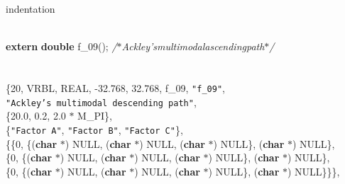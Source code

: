 %
%
\expandafter\ifx\csname indentation\endcsname\relax
\newlength{\indentation}\fi
\setlength{\indentation}{0.5em}
\begin{flushleft}
\mbox{}\\
{\bf extern} {\bf double}	f\_09();		\hfill{\it /$\ast$\hspace*{1\indentation}Ackley's\hspace*{1\indentation}multimodal\hspace*{1\indentation}ascending\hspace*{1\indentation}path\hspace*{8\indentation}$\ast$/}\mbox{}\\
\mbox{}\\
\mbox{}\\
\{20, VRBL, REAL, -32.768, 32.768, f\_09, {\tt "f\_09"},\mbox{}\\
{\tt "Ackley's multimodal descending path"},\mbox{}\\
\{20.0, 0.2, 2.0 $\ast$ M\_PI\},\mbox{}\\
\{{\tt "Factor A"}, {\tt "Factor B"}, {\tt "Factor C"}\},\mbox{}\\
\{\{0, \{({\bf char} $\ast$) NULL, ({\bf char} $\ast$) NULL, ({\bf char} $\ast$) NULL\}, ({\bf char} $\ast$) NULL\},\mbox{}\\
\hspace*{1\indentation}\{0, \{({\bf char} $\ast$) NULL, ({\bf char} $\ast$) NULL, ({\bf char} $\ast$) NULL\}, ({\bf char} $\ast$) NULL\},\mbox{}\\
\hspace*{1\indentation}\{0, \{({\bf char} $\ast$) NULL, ({\bf char} $\ast$) NULL, ({\bf char} $\ast$) NULL\}, ({\bf char} $\ast$) NULL\}\}\},\mbox{}\\
\end{flushleft}
